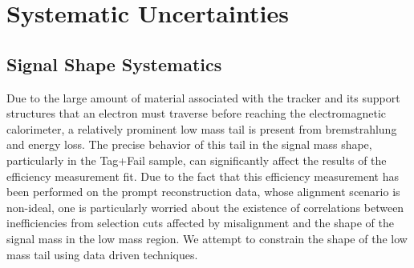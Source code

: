 \section{Systematic Uncertainties}

\subsection{Signal Shape Systematics}
Due to the large amount of material associated with the tracker and its support structures that an electron must traverse before reaching the electromagnetic calorimeter, a relatively prominent low mass tail is present from bremstrahlung and energy loss. The precise behavior of this tail in the signal mass shape, particularly in the Tag+Fail sample, can significantly affect the results of the efficiency measurement fit. Due to the fact that this efficiency measurement has been performed on the prompt reconstruction data, whose alignment scenario is non-ideal, one is particularly worried about the existence of correlations between inefficiencies from selection cuts affected by misalignment and the shape of the signal mass in the low mass region. We attempt to constrain the shape of the low mass tail using data driven techniques.

